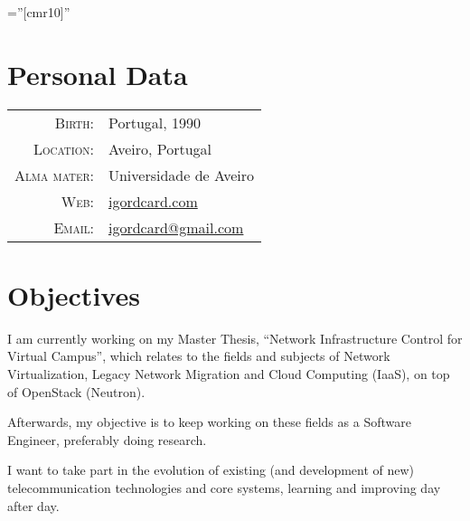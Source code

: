 \documentclass[a4paper,10pt]{article} %
\begin{document}
\pagestyle{empty} %

\font\fb=''[cmr10]'' %



\par{\bigskip\par} %

\section{Personal Data}

\begin{tabular}{rl}
\textsc{Birth:} & Portugal, 1990 \\
\textsc{Location:} & Aveiro, Portugal \\
\textsc{Alma mater:} & Universidade de Aveiro\\
\textsc{Web:} & \href{http://igordcard.com}{igordcard.com}\\
\textsc{Email:} & \href{mailto:igordcard+cv@gmail.com}{igordcard@gmail.com}
\end{tabular}


\section{Objectives}

I am currently working on my Master Thesis, ``Network Infrastructure Control for Virtual Campus'', 
which relates to the fields and subjects of Network Virtualization, Legacy Network Migration and Cloud Computing (IaaS), 
on top of OpenStack (Neutron).

Afterwards, my objective is to keep working on these fields as a Software Engineer, preferably doing research.

I want to take part in the evolution of existing (and development of new) telecommunication technologies 
and core systems, learning and improving day after day.


\end{document}
